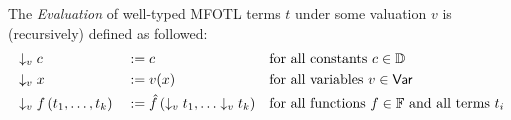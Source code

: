 \begin{definition}
    \label{def:mfotl-evaluation}
    The \emph{Evaluation} of well-typed MFOTL terms $t$ under some valuation $v$ is (recursively) defined as followed:
    \begin{align*}
        &\downarrow_v c
            &&:= c
            && \text{for all constants } c \in \mathbb{D}\\
        &\downarrow_v x
            &&:= v(x)
            && \text{for all variables } v \in \mathsf{Var}\\
        &\downarrow_v f\left(t_1,\dots,t_k\right)
            &&:= \hat{f}\left(\downarrow_v t_1, \dots \downarrow_v t_k \right)
            && \text{for all functions } f \in \mathbb{F} \text{ and all terms } t_i
    \end{align*}
\end{definition}


